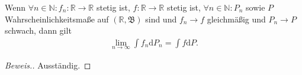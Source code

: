 \begin{lemma}
    Wenn $\forall n\in\mathbb{N}:f_n:\mathbb{R}\to\mathbb{R}$ stetig ist, $f:\mathbb{R}\to\mathbb{R}$ stetig ist, $\forall n\in\mathbb{N}:P_n$ sowie $P$ Wahrscheinlichkeitsmaße auf $(\mathbb{R},\mathfrak{B})$ sind und $f_n\to f$ gleichmäßig und $P_n\to P$ schwach, dann gilt
    \begin{align*}
        \lim_{n\to\infty}\int f_n\mathrm{d}P_n=\int f\mathrm{d}P.
    \end{align*}
\end{lemma}
\begin{proof}[Beweis.]
    Ausständig.
\end{proof}